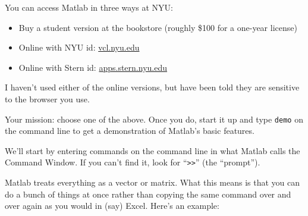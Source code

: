\documentclass[11pt]{exam}
\begin{document}
\begin{questions}
You can access Matlab in three ways at NYU:
\begin{itemize}
\item Buy a student version at the bookstore (roughly \$100 for a one-year license)
\item Online with NYU id:  \url{vcl.nyu.edu}
\item Online with Stern id: \url{apps.stern.nyu.edu}
\end{itemize}
I haven't used either of the online versions,
but have been told they are sensitive to the browser you use. %


Your mission:  choose one of the above.
Once you do, start it up and type
{\tt demo} on the command line to get a demonstration of Matlab's basic
features.

 We'll start by entering commands on the command line
in what Matlab calls the Command Window.
If you can't find it, look for ``{\tt >>}'' (the ``prompt'').

Matlab treats everything as a vector or matrix.
What this means is that you can do a bunch of things at once rather than copying the same command
over and over again as you would in (say) Excel.  Here's an example:
\end{questions}
\end{document}
